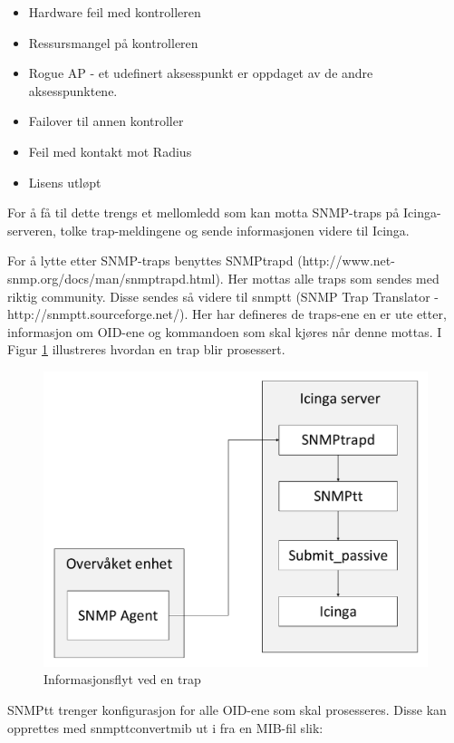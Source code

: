 \begin{itemize}
	\item Hardware feil med kontrolleren
	\item Ressursmangel på kontrolleren
	\item Rogue AP - et udefinert aksesspunkt er oppdaget av de andre aksesspunktene.
	\item Failover til annen kontroller
	\item Feil med kontakt mot Radius
	\item Lisens utløpt
\end{itemize}

For å få til dette trengs et mellomledd som kan motta SNMP-traps på Icinga-serveren, tolke trap-meldingene og sende informasjonen videre til Icinga. 

For å lytte etter SNMP-traps benyttes SNMPtrapd (http://www.net-snmp.org/docs/man/snmptrapd.html). Her mottas alle traps som sendes med riktig community. Disse sendes så videre til snmptt (SNMP Trap Translator - http://snmptt.sourceforge.net/). Her har defineres de traps-ene en er ute etter, informasjon om OID-ene og kommandoen som skal kjøres når denne mottas. I Figur \ref{snmptrap} illustreres hvordan en trap blir prosessert. 

\begin{figure}
    \centering
    \includegraphics[scale=0.6]{img/SNMPtrap}
    \caption{Informasjonsflyt ved en trap}
    \label{snmptrap}
\end{figure}



SNMPtt trenger konfigurasjon for alle OID-ene som skal prosesseres. Disse kan opprettes med snmpttconvertmib ut i fra en MIB-fil slik:

